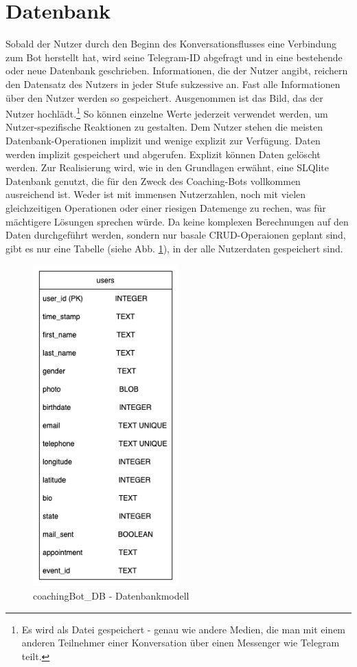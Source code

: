     \section{Datenbank} \label{Realisierung: Datenbank}
        Sobald der Nutzer durch den Beginn des Konversationsflusses eine Verbindung zum Bot herstellt hat, wird seine Telegram-ID abgefragt und in eine bestehende oder neue Datenbank geschrieben. Informationen, die der Nutzer angibt, reichern den Datensatz des Nutzers in jeder Stufe sukzessive an. Fast alle Informationen über den Nutzer werden so gespeichert. Ausgenommen ist das Bild, das der Nutzer hochlädt.\footnote{Es wird als Datei gespeichert - genau wie andere Medien, die man mit einem anderen Teilnehmer einer Konversation über einen Messenger wie Telegram teilt.} So können einzelne Werte jederzeit verwendet werden, um Nutzer-spezifische Reaktionen zu gestalten. Dem Nutzer stehen die meisten Datenbank-Operationen implizit und wenige explizit zur Verfügung. Daten werden implizit gespeichert und abgerufen. Explizit können Daten gelöscht werden. Zur Realisierung wird, wie in den Grundlagen erwähnt, eine SLQlite Datenbank genutzt, die für den Zweck des Coaching-Bots vollkommen ausreichend ist. Weder ist mit immensen Nutzerzahlen, noch mit vielen gleichzeitigen Operationen oder einer riesigen Datemenge zu rechen, was für mächtigere Lösungen sprechen würde. Da keine komplexen Berechnungen auf den Daten durchgeführt werden, sondern nur basale CRUD-Operaionen geplant sind, gibt es nur eine Tabelle (siehe Abb. \ref{fig: data base model}), in der alle Nutzerdaten gespeichert sind.
        \begin{figure} %
            \centering
            \includegraphics[width=0.5\textwidth]{images/220325_PA28464_DataBaseModel.png}
            \caption{coachingBot\_DB - Datenbankmodell}
            \label{fig: data base model}
        \end{figure}


